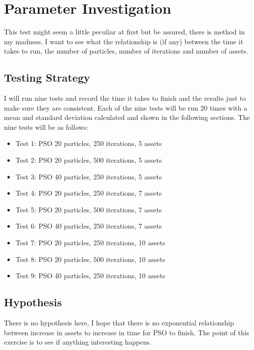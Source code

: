   \section{Parameter Investigation} %
  \label{sec:relationships}
  This test might seem a little peculiar at first but be assured, there is method in my madness. I want to see what the relationship is (if any) between the time it takes to run, the number of particles, number of iterations and number of assets.

    \subsection{Testing Strategy} %
    \label{sub:testing_strategy}
      I will run nine tests and record the time it takes to finish and the results just to make sure they are consistent. Each of the nine tests will be run 20 times with a mean and standard deviation calculated and shown in the following sections. The nine tests will be as follows:
        \begin{itemize}
          \item Test 1: PSO 20 particles, 250 iterations, 5 assets
          \item Test 2: PSO 20 particles, 500 iterations, 5 assets
          \item Test 3: PSO 40 particles, 250 iterations, 5 assets
          \item Test 4: PSO 20 particles, 250 iterations, 7 assets
          \item Test 5: PSO 20 particles, 500 iterations, 7 assets
          \item Test 6: PSO 40 particles, 250 iterations, 7 assets
          \item Test 7: PSO 20 particles, 250 iterations, 10 assets
          \item Test 8: PSO 20 particles, 500 iterations, 10 assets
          \item Test 9: PSO 40 particles, 250 iterations, 10 assets
        \end{itemize}

    \subsection{Hypothesis} %
    \label{sub:hypothesis}
    There is no hypothesis here, I hope that there is no exponential relationship between increase in assets to increase in time for PSO to finish. The point of this exercise is to see if anything interesting happens. 

